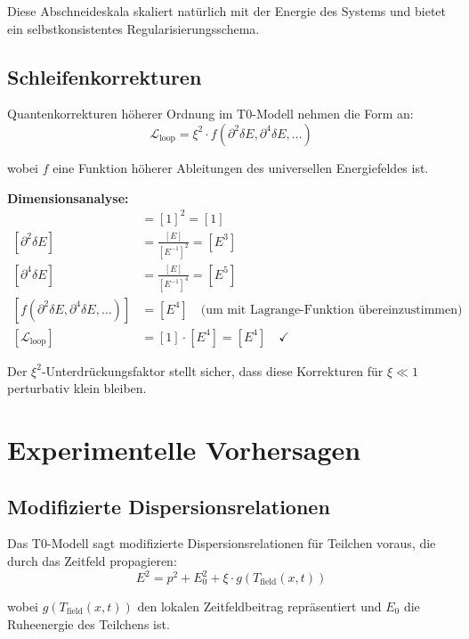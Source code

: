 \documentclass[12pt,a4paper]{report}
\begin{document}
	Diese Abschneideskala skaliert natürlich mit der Energie des Systems und bietet ein selbstkonsistentes Regularisierungsschema.
	
	\subsection{Schleifenkorrekturen}
	
	Quantenkorrekturen höherer Ordnung im T0-Modell nehmen die Form an:
	\begin{equation}
		\mathcal{L}_{\text{loop}} = \xi^2 \cdot f(\partial^2\delta E, \partial^4\delta E, \ldots)
	\end{equation}
	
	wobei $f$ eine Funktion höherer Ableitungen des universellen Energiefeldes ist.
	
	\textbf{Dimensionsanalyse:}
	\begin{align}
		[\xi^2] &= [1]^2 = [1] \\
		[\partial^2\delta E] &= \frac{[E]}{[E^{-1}]^2} = [E^3] \\
		[\partial^4\delta E] &= \frac{[E]}{[E^{-1}]^4} = [E^5] \\
		[f(\partial^2\delta E, \partial^4\delta E, \ldots)] &= [E^4] \quad \text{(um mit Lagrange-Funktion übereinzustimmen)} \\
		[\mathcal{L}_{\text{loop}}] &= [1] \cdot [E^4] = [E^4] \quad \checkmark
	\end{align}
	
	Der $\xi^2$-Unterdrückungsfaktor stellt sicher, dass diese Korrekturen für $\xi \ll 1$ perturbativ klein bleiben.
	
	\section{Experimentelle Vorhersagen}
	
	\subsection{Modifizierte Dispersionsrelationen}
	
	Das T0-Modell sagt modifizierte Dispersionsrelationen für Teilchen voraus, die durch das Zeitfeld propagieren:
	\begin{equation}
		E^2 = p^2 + E_0^2 + \xi \cdot g(T_{\text{field}}(x,t))
	\end{equation}
	
	wobei $g(T_{\text{field}}(x,t))$ den lokalen Zeitfeldbeitrag repräsentiert und $E_0$ die Ruheenergie des Teilchens ist.
	
\end{document}

